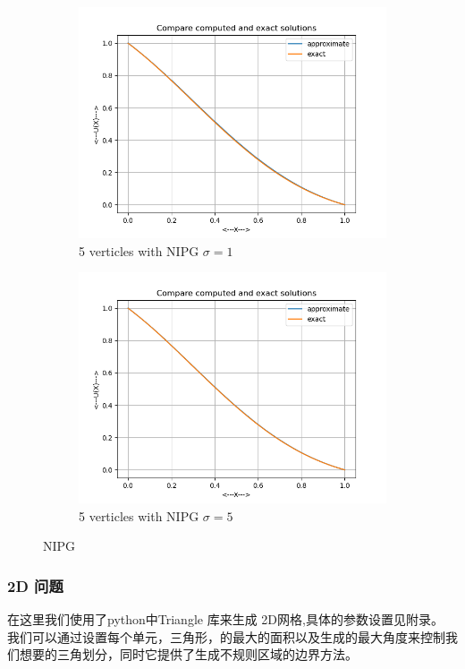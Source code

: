 \begin{figure}[H]
    \centering  
    \begin{subfigure}{0.5\textwidth}  
        \centering  
        \includegraphics[width=0.9\linewidth]{./pics/final/possion/1d/n5ss1p1.png}  
        \caption{5 verticles with NIPG $\sigma=1$}  
    \end{subfigure}%
    \begin{subfigure}{0.5\textwidth}  
        \centering  
        \includegraphics[width=0.9\linewidth]{./pics/final/possion/1d/n5ss1p5.png}  
        \caption{5 verticles with NIPG $\sigma=5$}
    \end{subfigure}  
    \caption{NIPG}  
\end{figure} 

\subsubsection*{2D 问题}
在这里我们使用了python中Triangle 库来生成 2D网格,具体的参数设置见附录。 我们可以通过设置每个单元，三角形，的最大的面积以及生成的最大角度来控制我们想要的三角划分，同时它提供了生成不规则区域的边界方法。

